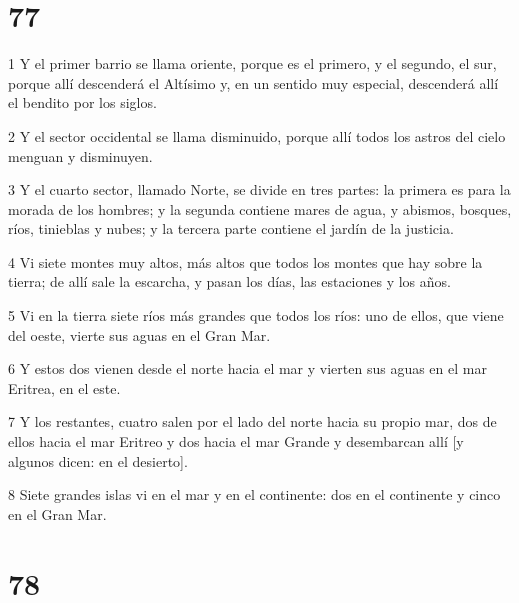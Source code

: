 \chapter{77}

\par 1 Y el primer barrio se llama oriente, porque es el primero, y el segundo, el sur, porque allí descenderá el Altísimo y, en un sentido muy especial, descenderá allí el bendito por los siglos.
\par 2 Y el sector occidental se llama disminuido, porque allí todos los astros del cielo menguan y disminuyen.
\par 3 Y el cuarto sector, llamado Norte, se divide en tres partes: la primera es para la morada de los hombres; y la segunda contiene mares de agua, y abismos, bosques, ríos, tinieblas y nubes; y la tercera parte contiene el jardín de la justicia.
\par 4 Vi siete montes muy altos, más altos que todos los montes que hay sobre la tierra; de allí sale la escarcha, y pasan los días, las estaciones y los años.
\par 5 Vi en la tierra siete ríos más grandes que todos los ríos: uno de ellos, que viene del oeste, vierte sus aguas en el Gran Mar.
\par 6 Y estos dos vienen desde el norte hacia el mar y vierten sus aguas en el mar Eritrea, en el este.
\par 7 Y los restantes, cuatro salen por el lado del norte hacia su propio mar, dos de ellos hacia el mar Eritreo y dos hacia el mar Grande y desembarcan allí [y algunos dicen: en el desierto].
\par 8 Siete grandes islas vi en el mar y en el continente: dos en el continente y cinco en el Gran Mar.

\chapter{78}

